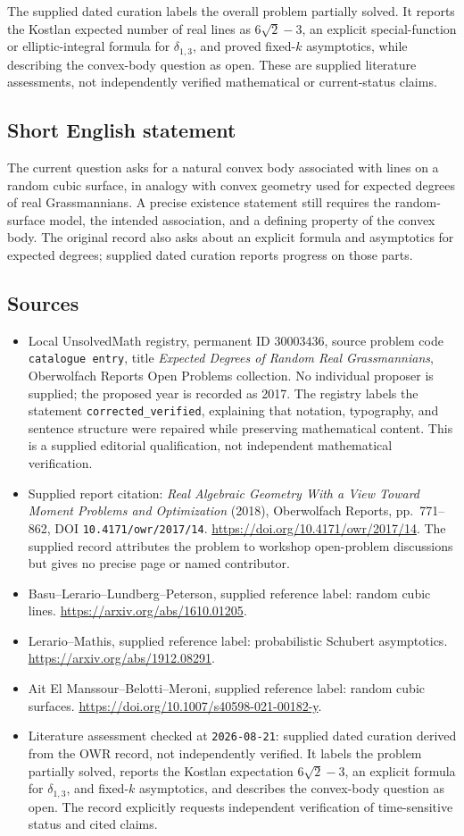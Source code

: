 \documentclass[11pt]{article}
\begin{document}
The supplied dated curation labels the overall problem partially solved. It reports the Kostlan expected number of real lines as \(6\sqrt{2}-3\), an explicit special-function or elliptic-integral formula for \(\delta_{1,3}\), and proved fixed-\(k\) asymptotics, while describing the convex-body question as open. These are supplied literature assessments, not independently verified mathematical or current-status claims.
\subsection{Short English statement}
The current question asks for a natural convex body associated with lines on a random cubic surface, in analogy with convex geometry used for expected degrees of real Grassmannians. A precise existence statement still requires the random-surface model, the intended association, and a defining property of the convex body. The original record also asks about an explicit formula and asymptotics for expected degrees; supplied dated curation reports progress on those parts.
\subsection{Sources}
\begin{itemize}
\item Local UnsolvedMath registry, permanent ID \(30003436\), source problem code \texttt{catalogue entry}, title \emph{Expected Degrees of Random Real Grassmannians}, Oberwolfach Reports Open Problems collection. No individual proposer is supplied; the proposed year is recorded as 2017. The registry labels the statement \texttt{corrected\_verified}, explaining that notation, typography, and sentence structure were repaired while preserving mathematical content. This is a supplied editorial qualification, not independent mathematical verification.
\item Supplied report citation: \emph{Real Algebraic Geometry With a View Toward Moment Problems and Optimization} (2018), Oberwolfach Reports, pp.\ 771--862, DOI \texttt{10.4171/owr/2017/14}. \url{https://doi.org/10.4171/owr/2017/14}. The supplied record attributes the problem to workshop open-problem discussions but gives no precise page or named contributor.
\item Basu--Lerario--Lundberg--Peterson, supplied reference label: random cubic lines. \url{https://arxiv.org/abs/1610.01205}.
\item Lerario--Mathis, supplied reference label: probabilistic Schubert asymptotics. \url{https://arxiv.org/abs/1912.08291}.
\item Ait El Manssour--Belotti--Meroni, supplied reference label: random cubic surfaces. \url{https://doi.org/10.1007/s40598-021-00182-y}.
\item Literature assessment checked at \texttt{2026-08-21}: supplied dated curation derived from the OWR record, not independently verified. It labels the problem partially solved, reports the Kostlan expectation \(6\sqrt{2}-3\), an explicit formula for \(\delta_{1,3}\), and fixed-\(k\) asymptotics, and describes the convex-body question as open. The record explicitly requests independent verification of time-sensitive status and cited claims.
\end{itemize}
\end{document}
